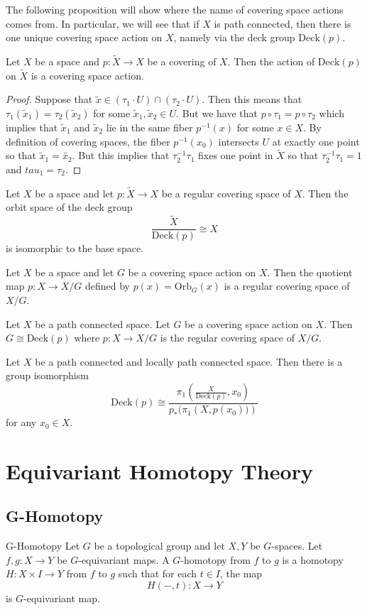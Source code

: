 \documentclass[a4paper]{article}
\begin{document}
The following proposition will show where the name of covering space actions comes from. In particular, we will see that if $X$ is path connected, then there is one unique covering space action on $X$, namely via the deck group $\text{Deck}(p)$. 

\begin{prp}{}{} Let $X$ be a space and $p:\tilde{X}\to X$ be a covering of $X$. Then the action of $\text{Deck}(p)$ on $\tilde{X}$ is a covering space action. \tcbline
\begin{proof}
Suppose that $\tilde{x}\in(\tau_1\cdot U)\cap(\tau_2\cdot U)$. Then this means that $\tau_1(\tilde{x}_1)=\tau_2(\tilde{x}_2)$ for some $\tilde{x}_1,\tilde{x}_2\in U$. But we have that $p\circ\tau_1=p\circ\tau_2$ which implies that $\tilde{x}_1$ and $\tilde{x}_2$ lie in the same fiber $p^{-1}(x)$ for some $x\in X$. By definition of covering spaces, the fiber $p^{-1}(x_0)$ intersects $U$ at exactly one point so that $\tilde{x}_1=\tilde{x_2}$. But this implies that $\tau_2^{-1}\tau_1$ fixes one point in $\tilde{X}$ so that $\tau_2^{-1}\tau_1=1$ and $tau_1=\tau_2$. 
\end{proof}
\end{prp}

\begin{lmm}{}{} Let $X$ be a space and let $p:\tilde{X}\to X$ be a regular covering space of $X$. Then the orbit space of the deck group $$\frac{\tilde{X}}{\text{Deck}(p)}\cong X$$ is isomorphic to the base space. 
\end{lmm}

\begin{prp}{}{} Let $X$ be a space and let $G$ be a covering space action on $X$. Then the quotient map $p:X\to X/G$ defined by $p(x)=\text{Orb}_G(x)$ is a regular covering space of $X/G$. 
\end{prp}

\begin{thm}{}{} Let $X$ be a path connected space. Let $G$ be a covering space action on $X$. Then $G\cong\text{Deck}(p)$ where $p:X\to X/G$ is the regular covering space of $X/G$. 
\end{thm}

\begin{crl}{}{} Let $X$ be a path connected and locally path connected space. Then there is a group isomorphism $$\text{Deck}(p)\cong\frac{\pi_1\left(\frac{X}{\text{Deck}(p)},x_0\right)}{p_\ast(\pi_1\left(X,p(x_0))\right)}$$ for any $x_0\in X$. 
\end{crl}

\pagebreak
\section{Equivariant Homotopy Theory}
\subsection{G-Homotopy}
\begin{defn}{G-Homotopy}{} Let $G$ be a topological group and let $X,Y$ be $G$-spaces. Let $f,g:X\to Y$ be $G$-equivariant maps. A $G$-homotopy from $f$ to $g$ is a homotopy $H:X\times I\to Y$ from $f$ to $g$ such that for each $t\in I$, the map $$H(-,t):X\to Y$$ is $G$-equivariant map. 
\end{defn}
\end{document}
